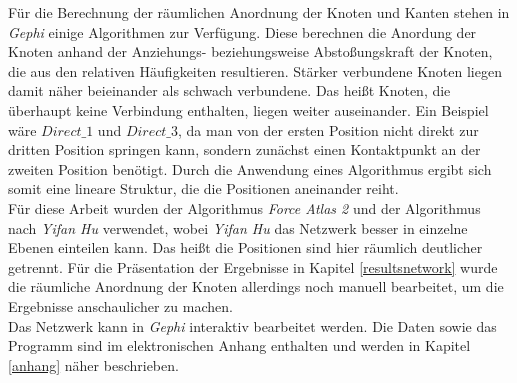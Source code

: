 Für die Berechnung der räumlichen Anordnung der Knoten und Kanten stehen in \textit{Gephi} einige Algorithmen zur Verfügung. Diese berechnen die Anordung der Knoten anhand der Anziehungs- beziehungsweise Abstoßungskraft der Knoten, die aus den relativen Häufigkeiten resultieren. Stärker verbundene Knoten liegen damit näher beieinander als schwach verbundene. Das heißt Knoten, die überhaupt keine Verbindung enthalten, liegen weiter auseinander. Ein Beispiel wäre $Direct\_1$ und $Direct\_3$, da man von der ersten Position nicht direkt zur dritten Position springen kann, sondern zunächst einen Kontaktpunkt an der zweiten Position benötigt. Durch die Anwendung eines Algorithmus ergibt sich somit eine lineare Struktur, die die Positionen aneinander reiht.\\
Für diese Arbeit wurden der Algorithmus \textit{Force Atlas 2} \cite{forceatlas2} und der Algorithmus nach \textit{Yifan Hu} \cite{yifanhu} verwendet, wobei \textit{Yifan Hu} das Netzwerk besser in einzelne Ebenen einteilen kann. Das heißt die Positionen sind hier räumlich deutlicher getrennt. Für die Präsentation der Ergebnisse in Kapitel \ref{resultsnetwork} wurde die räumliche Anordnung der Knoten allerdings noch manuell bearbeitet, um die Ergebnisse anschaulicher zu machen.\\
Das Netzwerk kann in \textit{Gephi} interaktiv bearbeitet werden. Die Daten sowie das Programm sind im elektronischen Anhang enthalten und werden in Kapitel \ref{anhang} näher beschrieben.



